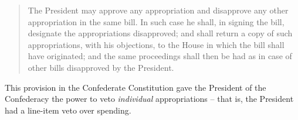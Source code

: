 \begin{quote}
The President may approve any appropriation and disapprove any other appropriation in the same bill. 
In such case he shall, in signing the bill, designate the appropriations disapproved; and shall return a copy of such appropriations, with his objections, to the House in which the bill shall have originated; and the same proceedings shall then be had as in case of other bills disapproved by the President.
\end{quote}

This provision in the Confederate Constitution gave the President of the Confederacy the power to veto \textit{individual} appropriations -- that is, the President had a line-item veto over spending.


